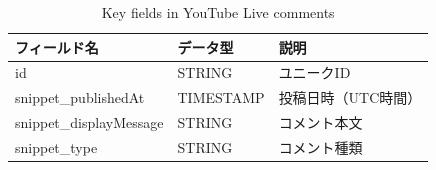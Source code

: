 \begin{table}[htbp]
  \centering
  \caption{Key fields in YouTube Live comments}
  \label{tab:key_fields_youtube_live_comments}
  \begin{tabular}{lll}
    \hline
    フィールド名            & データ型      & 説明     \\
    \hline
    \hline
    id                    & STRING  & ユニークID \\
    snippet\_publishedAt   & TIMESTAMP & 投稿日時（UTC時間）   \\
    snippet\_displayMessage & STRING & コメント本文 \\
    snippet\_type          & STRING & コメント種類 \\
    \hline
  \end{tabular}
\end{table}
